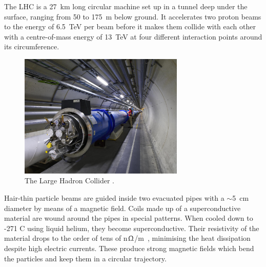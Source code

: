 The LHC is a 27~km long circular machine set up in a tunnel deep under the surface, ranging from 50 to 175~m below ground. It accelerates two proton beams to the energy of 6.5~TeV per beam before it makes them collide with each other with a centre-of-mass energy of 13~TeV at four different interaction points around its circumference. 
\begin{figure}[!t]
\centering
\includegraphics[width=0.7\textwidth]{01_introduction/pics/lhc}
\caption{The Large Hadron Collider \cite{Maximilien:1324852}.}
\label{fig:lhc}
\end{figure}
Hair-thin particle beams are guided inside two evacuated pipes with a $\sim$5~cm diameter by means of a magnetic field. Coils made up of a superconductive material are wound around the pipes in special patterns. When cooled down to -271 \textdegree C using liquid helium, they become superconductive. Their resistivity of the material drops to the order of tens of n$\Upomega$/m~\cite{Devred:796105}, minimising the heat dissipation despite high electric currents. These produce strong magnetic fields which bend the particles and keep them in a circular trajectory. 


